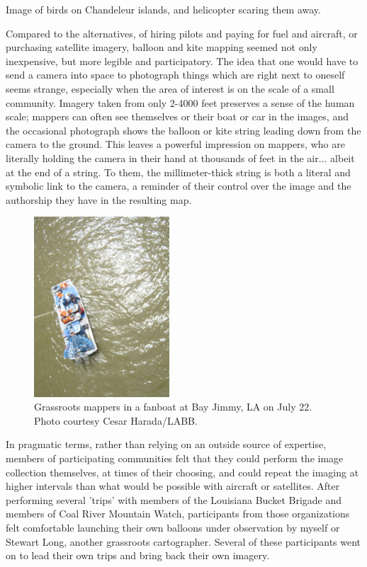 \documentclass[11pt]{report}
\begin{document}
Image of birds on Chandeleur islands, and helicopter scaring them away.  

Compared to the alternatives, of hiring pilots and paying for fuel and aircraft, or purchasing satellite imagery, balloon and kite mapping seemed not only inexpensive, but more legible and participatory. The idea that one would have to send a camera into space to photograph things which are right next to oneself seems strange, especially when the area of interest is on the scale of a small community. Imagery taken from only 2-4000 feet preserves a sense of the human scale; mappers can often see themselves or their boat or car in the images, and the occasional photograph shows the balloon or kite string leading down from the camera to the ground. This leaves a powerful impression on mappers, who are literally holding the camera in their hand at thousands of feet in the air... albeit at the end of a string. To them, the millimeter-thick string is both a literal and symbolic link to the camera, a reminder of their control over the image and the authorship they have in the resulting map.  

\begin{figure}
	\begin{flushright}
		\includegraphics[width=0.45\textwidth]{images/labb-bay-jimmy.jpg}
		\caption{Grassroots mappers in a fanboat at Bay Jimmy, LA on July 22. Photo courtesy Cesar Harada/LABB.}
	\end{flushright}
\end{figure}

In pragmatic terms, rather than relying on an outside source of expertise, members of participating communities felt that they could perform the image collection themselves, at times of their choosing, and could repeat the imaging at higher intervals than what would be possible with aircraft or satellites. After performing several 'trips' with members of the Louisiana Bucket Brigade and members of Coal River Mountain Watch, participants from those organizations felt comfortable launching their own balloons under observation by myself or Stewart Long, another grassroots cartographer. Several of these participants went on to lead their own trips and bring back their own imagery.
\end{document}
